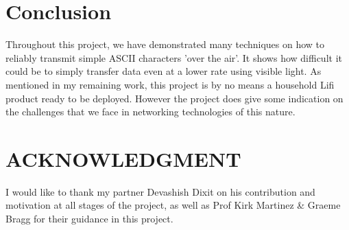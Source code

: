 \documentclass[letterpaper, 10 pt, conference]{ieeeconf}  %
\begin{document}
\section{Conclusion}

Throughout this project, we have demonstrated many techniques on how to reliably transmit simple ASCII characters 'over the air'. It shows how difficult it could be to simply transfer data even at a lower rate using visible light. As mentioned in my remaining work, this project is by no means a household Lifi product ready to be deployed. However the project does give some indication on the challenges that we face in networking technologies of this nature. 


\section*{ACKNOWLEDGMENT}

I would like to thank my partner Devashish Dixit on his contribution and motivation at all stages of the project, as well as Prof Kirk Martinez \& Graeme Bragg for their guidance in this project.



\end{document}

